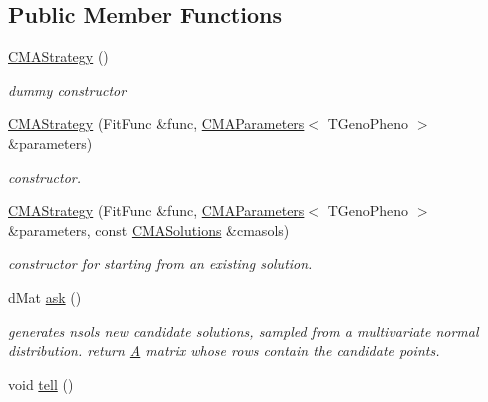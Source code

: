 \subsection*{Public Member Functions}
\begin{DoxyCompactItemize}
\item 
\hypertarget{classlibcmaes_1_1CMAStrategy_a855fbfb7dd9745ea764648f8965d1f3e}{\hyperlink{classlibcmaes_1_1CMAStrategy_a855fbfb7dd9745ea764648f8965d1f3e}{C\-M\-A\-Strategy} ()}\label{classlibcmaes_1_1CMAStrategy_a855fbfb7dd9745ea764648f8965d1f3e}

\begin{DoxyCompactList}\small\item\em dummy constructor \end{DoxyCompactList}\item 
\hyperlink{classlibcmaes_1_1CMAStrategy_a5455e7245be35c169e4144eb666f94f3}{C\-M\-A\-Strategy} (Fit\-Func \&func, \hyperlink{classlibcmaes_1_1CMAParameters}{C\-M\-A\-Parameters}$<$ T\-Geno\-Pheno $>$ \&parameters)
\begin{DoxyCompactList}\small\item\em constructor. \end{DoxyCompactList}\item 
\hyperlink{classlibcmaes_1_1CMAStrategy_a30decb362a4dd4c9557f0989d618aa93}{C\-M\-A\-Strategy} (Fit\-Func \&func, \hyperlink{classlibcmaes_1_1CMAParameters}{C\-M\-A\-Parameters}$<$ T\-Geno\-Pheno $>$ \&parameters, const \hyperlink{classlibcmaes_1_1CMASolutions}{C\-M\-A\-Solutions} \&cmasols)
\begin{DoxyCompactList}\small\item\em constructor for starting from an existing solution. \end{DoxyCompactList}\item 
\hypertarget{classlibcmaes_1_1CMAStrategy_ab7266bc50732458ffcab690bc26380e6}{d\-Mat \hyperlink{classlibcmaes_1_1CMAStrategy_ab7266bc50732458ffcab690bc26380e6}{ask} ()}\label{classlibcmaes_1_1CMAStrategy_ab7266bc50732458ffcab690bc26380e6}

\begin{DoxyCompactList}\small\item\em generates nsols new candidate solutions, sampled from a multivariate normal distribution. return \hyperlink{classA}{A} matrix whose rows contain the candidate points. \end{DoxyCompactList}\item 
\hypertarget{classlibcmaes_1_1CMAStrategy_a03d9a4f9338ccd55141323ca309dbdfa}{void \hyperlink{classlibcmaes_1_1CMAStrategy_a03d9a4f9338ccd55141323ca309dbdfa}{tell} ()}\label{classlibcmaes_1_1CMAStrategy_a03d9a4f9338ccd55141323ca309dbdfa}


\end{DoxyCompactItemize}
